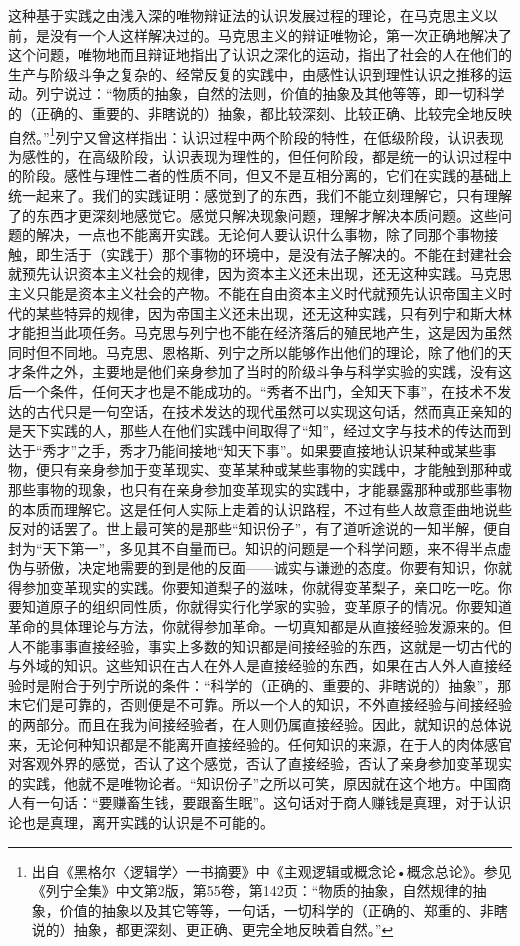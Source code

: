 \documentclass[UTF8, 12pt, a4paper]{ctexrep}
\begin{document}
这种基于实践之由浅入深的唯物辩证法的认识发展过程的理论，在马克思主义以前，是没有一个人这样解决过的。马克思主义的辩证唯物论，第一次正确地解决了这个问题，唯物地而且辩证地指出了认识之深化的运动，指出了社会的人在他们的生产与阶级斗争之复杂的、经常反复的实践中，由感性认识到理性认识之推移的运动。列宁说过：“物质的抽象，自然的法则，价值的抽象及其他等等，即一切科学的（正确的、重要的、非瞎说的）抽象，都比较深刻、比较正确、比较完全地反映自然。”\footnote{出自《黑格尔〈逻辑学〉一书摘要》中《主观逻辑或概念论•概念总论》。参见《列宁全集》中文第2版，第55卷，第142页：“物质的抽象，自然规律的抽象，价值的抽象以及其它等等，一句话，一切科学的（正确的、郑重的、非瞎说的）抽象，都更深刻、更正确、更完全地反映着自然。”}列宁又曾这样指出：认识过程中两个阶段的特性，在低级阶段，认识表现为感性的，在高级阶段，认识表现为理性的，但任何阶段，都是统一的认识过程中的阶段。感性与理性二者的性质不同，但又不是互相分离的，它们在实践的基础上统一起来了。我们的实践证明：感觉到了的东西，我们不能立刻理解它，只有理解了的东西才更深刻地感觉它。感觉只解决现象问题，理解才解决本质问题。这些问题的解决，一点也不能离开实践。无论何人要认识什么事物，除了同那个事物接触，即生活于（实践于）那个事物的环境中，是没有法子解决的。不能在封建社会就预先认识资本主义社会的规律，因为资本主义还未出现，还无这种实践。马克思主义只能是资本主义社会的产物。不能在自由资本主义时代就预先认识帝国主义时代的某些特异的规律，因为帝国主义还未出现，还无这种实践，只有列宁和斯大林才能担当此项任务。马克思与列宁也不能在经济落后的殖民地产生，这是因为虽然同时但不同地。马克思、恩格斯、列宁之所以能够作出他们的理论，除了他们的天才条件之外，主要地是他们亲身参加了当时的阶级斗争与科学实验的实践，没有这后一个条件，任何天才也是不能成功的。“秀者不出门，全知天下事”，在技术不发达的古代只是一句空话，在技术发达的现代虽然可以实现这句话，然而真正亲知的是天下实践的人，那些人在他们实践中间取得了“知”，经过文字与技术的传达而到达于“秀才”之手，秀才乃能间接地“知天下事”。如果要直接地认识某种或某些事物，便只有亲身参加于变革现实、变革某种或某些事物的实践中，才能触到那种或那些事物的现象，也只有在亲身参加变革现实的实践中，才能暴露那种或那些事物的本质而理解它。这是任何人实际上走着的认识路程，不过有些人故意歪曲地说些反对的话罢了。世上最可笑的是那些“知识份子”，有了道听途说的一知半解，便自封为“天下第一”，多见其不自量而已。知识的问题是一个科学问题，来不得半点虚伪与骄傲，决定地需要的到是他的反面——诚实与谦逊的态度。你要有知识，你就得参加变革现实的实践。你要知道梨子的滋味，你就得变革梨子，亲口吃一吃。你要知道原子的组织同性质，你就得实行化学家的实验，变革原子的情况。你要知道革命的具体理论与方法，你就得参加革命。一切真知都是从直接经验发源来的。但人不能事事直接经验，事实上多数的知识都是间接经验的东西，这就是一切古代的与外域的知识。这些知识在古人在外人是直接经验的东西，如果在古人外人直接经验时是附合于列宁所说的条件：“科学的（正确的、重要的、非瞎说的）抽象”，那末它们是可靠的，否则便是不可靠。所以一个人的知识，不外直接经验与间接经验的两部分。而且在我为间接经验者，在人则仍属直接经验。因此，就知识的总体说来，无论何种知识都是不能离开直接经验的。任何知识的来源，在于人的肉体感官对客观外界的感觉，否认了这个感觉，否认了直接经验，否认了亲身参加变革现实的实践，他就不是唯物论者。“知识份子”之所以可笑，原因就在这个地方。中国商人有一句话：“要赚畜生钱，要跟畜生眠”。这句话对于商人赚钱是真理，对于认识论也是真理，离开实践的认识是不可能的。
\end{document}
